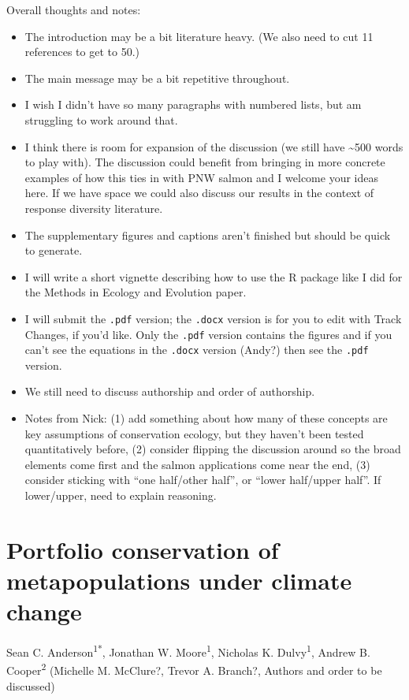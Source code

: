 Overall thoughts and notes:

\begin{itemize}
\item
  The introduction may be a bit literature heavy. (We also need to cut 11 references to get to 50.)
\item
  The main message may be a bit repetitive throughout.
\item
  I wish I didn't have so many paragraphs with numbered lists, but am struggling to work around that.
\item
  I think there is room for expansion of the discussion (we still have \textasciitilde{}500 words to play with). The discussion could benefit from bringing in more concrete examples of how this ties in with PNW salmon and I welcome your ideas here. If we have space we could also discuss our results in the context of response diversity literature.
\item
  The supplementary figures and captions aren't finished but should be quick to generate.
\item
  I will write a short vignette describing how to use the R package like I did for the Methods in Ecology and Evolution paper.
\item
  I will submit the \texttt{.pdf} version; the \texttt{.docx} version is for you to edit with Track Changes, if you'd like. Only the \texttt{.pdf} version contains the figures and if you can't see the equations in the \texttt{.docx} version (Andy?) then see the \texttt{.pdf} version.
\item
  We still need to discuss authorship and order of authorship.
\item
  Notes from Nick: (1) add something about how many of these concepts are key assumptions of conservation ecology, but they haven't been tested quantitatively before, (2) consider flipping the discussion around so the broad elements come first and the salmon applications come near the end, (3) consider sticking with ``one half/other half'', or ``lower half/upper half''. If lower/upper, need to explain reasoning.
\end{itemize}

\newpage

\section{Portfolio conservation of metapopulations under climate change}

\bigskip

Sean C. Anderson\textsuperscript{1*}, Jonathan W. Moore\textsuperscript{1}, Nicholas K. Dulvy\textsuperscript{1}, Andrew B. Cooper\textsuperscript{2} (Michelle M. McClure?, Trevor A. Branch?, Authors and order to be discussed)

